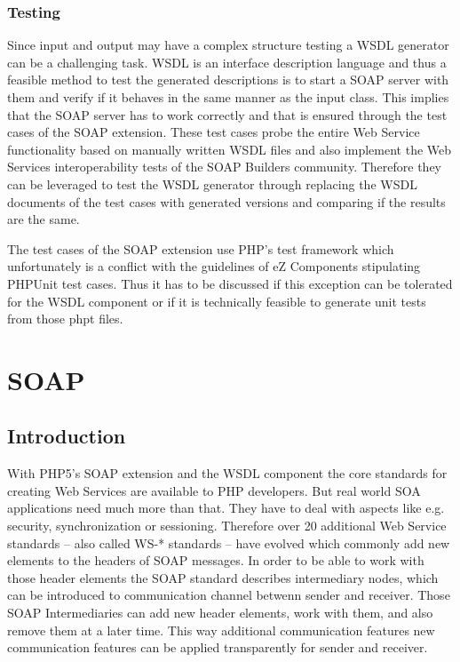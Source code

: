 \documentclass[10pt,final,a4paper,oneside]{article}
\begin{document}
\subsubsection{Testing}
Since input and output may have a complex structure
testing a WSDL generator can be a challenging task.
WSDL is an interface description language
and thus a feasible method to test the generated descriptions
is to start a SOAP server with them
and verify if it behaves in the same manner as the input class.
This implies that the SOAP server has to work correctly
and that is ensured through the test cases of the SOAP extension.
These test cases probe the entire Web Service functionality
based on manually written WSDL files and also implement the
Web Services interoperability tests of the SOAP Builders community.
Therefore they can be leveraged to test the WSDL generator
through replacing the WSDL documents of the test cases
with generated versions
and comparing if the results are the same.

The test cases of the SOAP extension use PHP's test framework
which unfortunately is a conflict with the guidelines of eZ Components
stipulating PHPUnit test cases.
Thus it has to be discussed
if this exception can be tolerated for the WSDL component
or if it is technically feasible to generate unit tests
from those phpt files.





\section{SOAP}\label{sec:SOAP}
%
\subsection{Introduction}
With PHP5's SOAP extension and the WSDL component
the core standards for creating Web Services
are available to PHP developers.
But real world SOA applications need much more than that.
They have to deal with aspects
like e.g. security, synchronization or sessioning.
Therefore over 20 additional Web Service standards
-- also called WS-* standards --
have evolved which commonly add new elements
to the headers of SOAP messages.
In order to be able to work with those header elements
the SOAP standard describes intermediary nodes,
which can be introduced to communication channel
betwenn sender and receiver.
Those SOAP Intermediaries
can add new header elements, work with them,
and also remove them at a later time.
This way additional communication features
new communication features can be applied
transparently for sender and receiver.
\end{document}
